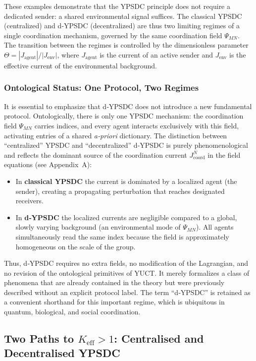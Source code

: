 \documentclass[11pt,a4paper]{article}
\begin{document}
	These examples demonstrate that the YPSDC principle does not require a dedicated sender: a shared
	environmental signal suffices. The classical YPSDC (centralized) and d‑YPSDC (decentralized) are thus
	two limiting regimes of a single coordination mechanism, governed by the same coordination field
	$\Psi_{MN}$. The transition between the regimes is controlled by the dimensionless parameter
	$\Theta = |J_{\mathrm{agent}}|/|J_{\mathrm{env}}|$, where $J_{\mathrm{agent}}$ is the current of an active
	sender and $J_{\mathrm{env}}$ is the effective current of the environmental background.
	
	\subsubsection*{Ontological Status: One Protocol, Two Regimes}
	
	It is essential to emphasize that d‑YPSDC does not introduce a new fundamental protocol.  
	Ontologically, there is only one YPSDC mechanism: the coordination field \(\Psi_{MN}\) carries 
	indices, and every agent interacts exclusively with this field, activating entries of a shared 
	\emph{a‑priori} dictionary. The distinction between “centralized” YPSDC and “decentralized” 
	d‑YPSDC is purely phenomenological and reflects the dominant source of the coordination 
	current \(J^{N}_{\mathrm{coord}}\) in the field equations (see Appendix~A):
	\begin{itemize}[leftmargin=*]
		\item In \textbf{classical YPSDC} the current is dominated by a localized agent (the sender), 
		creating a propagating perturbation that reaches designated receivers.
		\item In \textbf{d‑YPSDC} the localized currents are negligible compared to a global, slowly 
		varying background (an environmental mode of \(\Psi_{MN}\)). All agents simultaneously read 
		the same index because the field is approximately homogeneous on the scale of the group.
	\end{itemize}
	Thus, d‑YPSDC requires no extra fields, no modification of the Lagrangian, and no revision of 
	the ontological primitives of YUCT. It merely formalizes a class of phenomena that are already 
	contained in the theory but were previously described without an explicit protocol label.  
	The term “d‑YPSDC” is retained as a convenient shorthand for this important regime, which is 
	ubiquitous in quantum, biological, and social coordination.
	
\subsection{Two Paths to \(K_{\mathrm{eff}} > 1\): Centralised and Decentralised YPSDC}
\label{subsec:two-paths}
\end{document}
